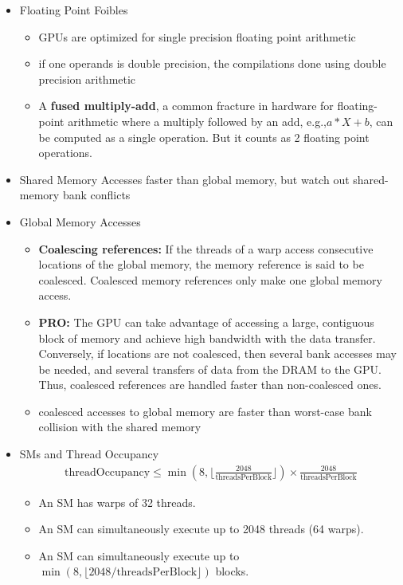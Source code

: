 \documentclass[../main.tex]{subfiles}
\begin{document}
\begin{itemize}
	\item Floating Point Foibles
	      \begin{itemize}
		      \item GPUs are optimized for single precision floating point arithmetic
		      \item if one operands is double precision, the compilations done using double precision arithmetic
		      \item A \textbf{fused multiply-add}, a common fracture in hardware for floating-point arithmetic where a multiply followed by an add, e.g.,\(a * X + b\), can be computed as a single operation. But it counts as 2 floating point operations.
	      \end{itemize}
	\item Shared Memory Accesses faster than global memory, but watch out shared-memory bank conflicts
	\item Global Memory Accesses
	      \begin{itemize}
		      \item \textbf{Coalescing references:} If the threads of a warp access consecutive locations of the global memory, the memory reference is said to be coalesced. Coalesced memory references only make one global memory access.
		      \item \textbf{PRO:} The GPU can take advantage of accessing a large, contiguous block of memory and achieve high bandwidth with the data transfer. Conversely, if locations are not coalesced, then several bank accesses may be needed, and several transfers of data from the DRAM to the GPU. Thus, coalesced references are handled faster than non-coalesced ones.
		      \item coalesced accesses to global memory are faster than worst-case bank collision with the shared memory
	      \end{itemize}
	\item SMs and Thread Occupancy
	      \begin{align*}
		      \text{threadOccupancy} \leq \min(8, \lfloor \frac{2048}{\text{threadsPerBlock}}\rfloor) \times \frac{2048}{\text{threadsPerBlock}}
	      \end{align*}
	      \begin{itemize}
		      \item An SM has warps of 32 threads.
		      \item An SM can simultaneously execute up to 2048 threads (64 warps).
		      \item An SM can simultaneously execute up to \(\min (8,\lfloor 2048 / \text{threadsPerBlock} \rfloor)\) blocks.

\end{itemize}
\end{itemize}
\end{document}
